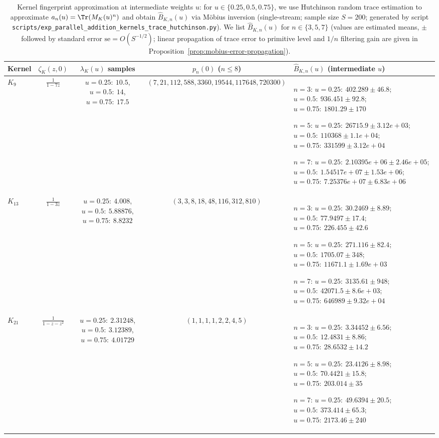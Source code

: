 \begin{table}[H]
\centering
\scriptsize
\setlength{\tabcolsep}{6pt}
\renewcommand{\arraystretch}{1.15}
\caption{Kernel fingerprint approximation at intermediate weights $u$: for $u\in\{0.25,0.5,0.75\}$, we use Hutchinson random trace estimation to approximate $a_n(u)=\Tr(M_K(u)^n)$ and obtain $\widehat B_{K,n}(u)$ via Möbius inversion (single-stream; sample size $S=200$; generated by script \texttt{scripts/exp\_parallel\_addition\_kernels\_trace\_hutchinson.py}). We list $\widehat B_{K,n}(u)$ for $n\in\{3,5,7\}$ (values are estimated means, $\pm$ followed by standard error $\mathrm{se}=O(S^{-1/2})$; linear propagation of trace error to primitive level and $1/n$ filtering gain are given in Proposition~\ref{prop:mobius-error-propagation}).}
\label{tab:parallel-addition-kernels-fingerprint-u-samples}
\begin{tabular}{@{}lccc p{}@{}}
\toprule
Kernel & $\zeta_K(z,0)$ & $\lambda_K(u)$ samples & $p_n(0)$ ($n\le 8$) & $\widehat B_{K,n}(u)$ (intermediate $u$) \\
\midrule
$K_{9}$ & $\frac{1}{1-7z}$ & $u=0.25:\ 10.5$, $u=0.5:\ 14$, $u=0.75:\ 17.5$ & $(7,21,112,588,3360,19544,117648,720300)$ & $n=3$: $u=0.25:\ 402.289 \pm 46.8$; $u=0.5:\ 936.451 \pm 92.8$; $u=0.75:\ 1801.29 \pm 170$\par $n=5$: $u=0.25:\ 26715.9 \pm 3.12e+03$; $u=0.5:\ 110368 \pm 1.1e+04$; $u=0.75:\ 331599 \pm 3.12e+04$\par $n=7$: $u=0.25:\ 2.10395e+06 \pm 2.46e+05$; $u=0.5:\ 1.54517e+07 \pm 1.53e+06$; $u=0.75:\ 7.25376e+07 \pm 6.83e+06$ \\
$K_{13}$ & $\frac{1}{1-3z}$ & $u=0.25:\ 4.008$, $u=0.5:\ 5.88876$, $u=0.75:\ 8.8232$ & $(3,3,8,18,48,116,312,810)$ & $n=3$: $u=0.25:\ 30.2469 \pm 8.89$; $u=0.5:\ 77.9497 \pm 17.4$; $u=0.75:\ 226.455 \pm 42.6$\par $n=5$: $u=0.25:\ 271.116 \pm 82.4$; $u=0.5:\ 1705.07 \pm 348$; $u=0.75:\ 11671.1 \pm 1.69e+03$\par $n=7$: $u=0.25:\ 3135.61 \pm 948$; $u=0.5:\ 42071.5 \pm 8.6e+03$; $u=0.75:\ 646989 \pm 9.32e+04$ \\
$K_{21}$ & $\frac{1}{1-z-z^2}$ & $u=0.25:\ 2.31248$, $u=0.5:\ 3.12389$, $u=0.75:\ 4.01729$ & $(1,1,1,1,2,2,4,5)$ & $n=3$: $u=0.25:\ 3.34452 \pm 6.56$; $u=0.5:\ 12.4831 \pm 8.86$; $u=0.75:\ 28.6532 \pm 14.2$\par $n=5$: $u=0.25:\ 23.4126 \pm 8.98$; $u=0.5:\ 70.4421 \pm 15.8$; $u=0.75:\ 203.014 \pm 35$\par $n=7$: $u=0.25:\ 49.6394 \pm 20.5$; $u=0.5:\ 373.414 \pm 65.3$; $u=0.75:\ 2173.46 \pm 240$ \\
\bottomrule
\end{tabular}
\end{table}
